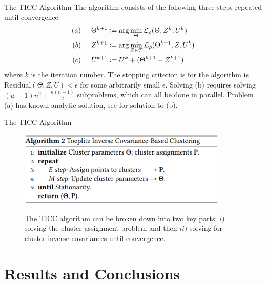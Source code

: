 \documentclass{beamer}
\newcommand{\defeq}{\vcentcolon=}
\begin{document}

\begin{frame}{The TICC Algorithm}
	The algorithm consists of the following three steps repeated until convergence
	\begin{align*}
		(a) \hspace{.5cm} & \Theta^{k+1} \defeq \arg\min\limits_{\Theta} \mathcal{L}_\rho(\Theta, Z^k, U^k) \\
		(b) \hspace{.5cm} & Z^{k+1} \defeq \arg\min\limits_{Z \in \mathcal{T}} \mathcal{L}_\rho(	\Theta^{k+1}, Z, U^k) \\
		(c) \hspace{.5cm} & 	U^{k+1} \defeq U^k + (\Theta^{k+1}- Z^{k+1})
	\end{align*}
	where $k$ is the iteration number. The stopping criterion is for the algorithm is Residual$(\Theta, Z, U) < \epsilon$ for some arbitrarily small $\epsilon$. Solving (b) requires solving $(w-1)n^2 + \frac{n(n-1)}{2}$ subproblems, which can all be done in parallel.  Problem (a) has known analytic solution, see \cite{paper} for solution to (b). 
\end{frame}


\begin{frame}{The TICC Algorithm}
	\begin{figure}
		\centering
		\includegraphics[width=10cm]{fig8.eps} \\ 
		\vspace{.25cm}
		\caption*{\centering The TICC algorithm can be broken down into two key parts: $i)$ solving the cluster assignment problem and then $ii)$ solving for cluster inverse covariances until convergence.}
	\end{figure}
\end{frame}


\section{Results and Conclusions}
\end{document}
